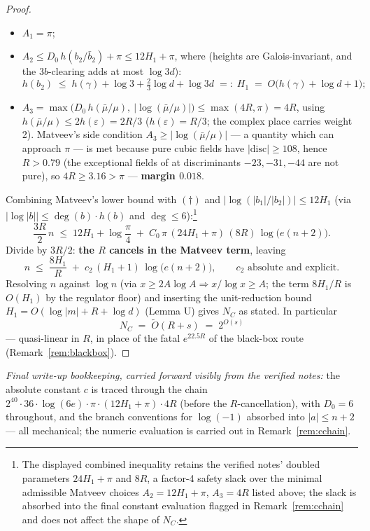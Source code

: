 \documentclass[11pt]{amsart}
\theoremstyle{plain}
\theoremstyle{remark}
\begin{document}
\begin{proof}
\begin{itemize}
\item $A_1 = \pi$;
\item $A_2 \le D_0\,h(b_2/\bar b_2) + \pi \le 12H_1 + \pi$, where
  (heights are Galois-invariant, and the $3b$-clearing adds at most
  $\log 3d$):
  \[
  h(b_2) \;\le\; h(\gamma) + \log 3 + \tfrac23\log d + \log 3d
  \;=:\; H_1 \;=\; O\bigl(h(\gamma) + \log d + 1\bigr);
  \]
\item $A_3 = \max\bigl(D_0\,h(\bar\mu/\mu),\
  |\log(\bar\mu/\mu)|\bigr) \le \max(4R, \pi) = 4R$, using
  $h(\bar\mu/\mu) \le 2h(\varepsilon) = 2R/3$
  ($h(\varepsilon) = R/3$; the complex place carries weight 2).
  Matveev's side condition $A_3 \ge |\log(\bar\mu/\mu)|$ --- a
  quantity which can approach $\pi$ --- is met because pure cubic
  fields have $|\mathrm{disc}| \ge 108$, hence $R > 0.79$ (the
  exceptional fields of \cite{ADF16} at discriminants $-23, -31,
  -44$ are not pure), so $4R \ge 3.16 > \pi$ ---
  \textbf{margin $0.018$}.
\end{itemize}

Combining Matveev's lower bound with $(\dagger)$ and
$|\log(|b_1|/|b_2|)| \le 12H_1$ (via
$|\log|b|| \le \deg(b)\cdot h(b)$ and
$\deg \le 6$):\footnote{The displayed combined inequality retains the
  verified notes' doubled parameters $24H_1 + \pi$ and $8R$, a
  factor-4 safety slack over the minimal admissible Matveev choices
  $A_2 = 12H_1 + \pi$, $A_3 = 4R$ listed above; the slack is absorbed
  into the final constant evaluation flagged in
  Remark~\ref{rem:cchain} and does not affect the shape of $N_C$.}
\[
\frac{3R}{2}\,n \;\le\; 12H_1 + \log\frac{\pi}{4}
\;+\; C_0\,\pi\,(24H_1 + \pi)\,(8R)\,\log\bigl(e(n+2)\bigr).
\]
Divide by $3R/2$: \textbf{the $R$ cancels in the Matveev term},
leaving
\[
n \;\le\; \frac{8H_1}{R} \;+\; c_2\,(H_1 + 1)\,
\log\bigl(e(n+2)\bigr),
\qquad c_2 \text{ absolute and explicit.}
\]
Resolving $n$ against $\log n$ (via $x \ge 2A\log A \Rightarrow
x/\log x \ge A$; the term $8H_1/R$ is $O(H_1)$ by the regulator
floor) and inserting the unit-reduction bound
$H_1 = O(\log|m| + R + \log d)$ (Lemma U) gives $N_C$ as stated. In
particular
\[
N_C \;=\; \widetilde O(R + s) \;=\; 2^{O(s)}
\]
--- quasi-linear in $R$, in place of the fatal $e^{22.5R}$ of the
black-box route (Remark~\ref{rem:blackbox}).
\end{proof}

\emph{Final write-up bookkeeping, carried forward visibly from the
verified notes:} the absolute constant $c$ is traced through the
chain $2^{40}\cdot 36\cdot\log(6e)\cdot\pi\cdot(12H_1+\pi)\cdot 4R$
(before the $R$-cancellation), with $D_0 = 6$ throughout, and the
branch conventions for $\log(-1)$ absorbed into $|a| \le n + 2$ ---
all mechanical; the numeric evaluation is carried out in
Remark~\ref{rem:cchain}.
\end{document}
